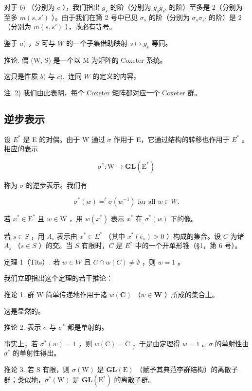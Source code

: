 对于 \(b)\) （分别为 \(c\) ），我们指出 \(g_{s}\) 的阶（分别为 \(g_{s}g_{s'}\) 的阶）至多是 2（分别为至多 \(m(s, s')\) ）。由于我们在第 2 号中已见 \(\sigma_{s}\) 的阶（分别为 \(\sigma_{s}\sigma_{s'}\) 的阶）是 2（分别为 \(m(s, s')\) ），故必有等号。

鉴于 \(a)\) ，\(S\) 可与 \(W\) 的一个子集借助映射 \(s \mapsto g_s\) 等同。

推论. 偶 (W, S) 是一个以 M 为矩阵的 Coxeter 系统。

这只是性质 \(b)\) 与 \(c),\) 连同 \(W\) 的定义的内容。

注. 2) 我们由此表明，每个 Coxeter 矩阵都对应一个 Coxeter 群。

\subsection{逆步表示}

设 \(E^{*}\) 是 E 的对偶。由于 W 通过 \(\sigma\) 作用于 E，它通过结构的转移也作用于 \(E^{*}\) 。相应的表示

\[
\sigma^ {*}: \mathrm{W} \to \mathbf {G L} (\mathrm{E} ^ {*})
\]

称为 \(\sigma\) 的逆步表示。我们有

\[
\sigma^ {*} (w) = ^ {t} \sigma \left(w ^ {- 1}\right) \text {   for   all   } w \in W.
\]

若 \(x^{*} \in \mathrm{E}^{*}\) 且 \(w \in \mathrm{W}\) ，用 \(w(x^{*})\) 表示 \(x^{*}\) 在 \(\sigma^{*}(w)\) 下的像。

若 \(s \in S\) ，用 \(A_s\) 表示由 \(x^* \in E^*\) （其中 \(x^*(e_s) > 0\) ）构成的集合。设 \(C\) 为诸 \(A_s\) （\(s \in S\) ）的交。当 \(S\) 有限时，\(C\) 是 \(E^*\) 中的一个开单形锥（§1，第 6 号）。

定理 1（Tits）. 若 \(w \in W\) 且 \(C \cap w(C) \neq \emptyset\) ，则 \(w = 1\) 。

我们立即指出这个定理的若干推论：

推论 1. 群 W 简单传递地作用于诸 \(w(\mathbf{C})\) （\(w \in \mathbf{W}\) ）所成的集合上。

这是显然的。

推论 2. 表示 \(\sigma\) 与 \(\sigma^{*}\) 都是单射的。

事实上，若 \(\sigma^{*}(w) = 1\) ，则 \(w(\mathrm{C}) = \mathrm{C}\) ，于是由定理得 \(w = 1\) 。\(\sigma\) 的单射性由 \(\sigma^{*}\) 的单射性得出。

推论 3. 若 S 有限，则 \(\sigma(\mathrm{W})\) 是 \(\mathbf{GL}(\mathrm{E})\) （赋予其典范李群结构）的离散子群；类似地，\(\sigma^{*}(\mathrm{W})\) 是 \(\mathbf{GL}(\mathrm{E}^{*})\) 的离散子群。

